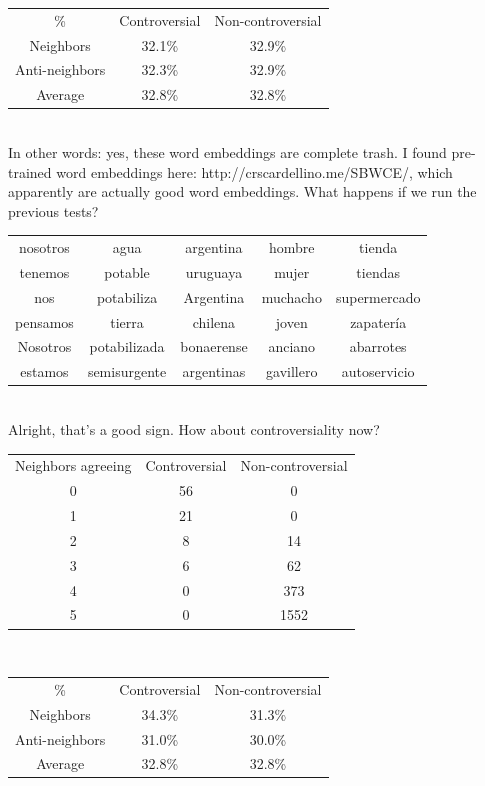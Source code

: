 \documentclass[11pt]{article} %
\begin{document}
\begin{tabular}{c|c|c}
\rowcolor{gray!50}\%   & Controversial & Non-controversial \\
Neighbors & 32.1\% &  32.9\%\\
Anti-neighbors & 32.3\% & 32.9\% \\
Average & 32.8\% &  32.8\% \end{tabular}\\

In other words: yes, these word embeddings are complete trash. I found pre-trained word embeddings here: http://crscardellino.me/SBWCE/, which apparently are actually good word embeddings. What happens if we run the previous tests?\\


\begin{tabular}{c|c|c|c|c}
\rowcolor{gray!50} nosotros & agua & argentina & hombre & tienda \\
tenemos & potable & uruguaya & mujer& tiendas \\
nos & potabiliza & Argentina & muchacho & supermercado \\
pensamos & tierra & chilena & joven & zapater\'ia\\
Nosotros & potabilizada & bonaerense & anciano & abarrotes\\
estamos & semisurgente & argentinas & gavillero & autoservicio \\
\end{tabular} \\

Alright, that's a good sign. How about controversiality now?\\

\begin{tabular}{c|c|c}
\rowcolor{gray!50} Neighbors agreeing & Controversial & Non-controversial \\
0 & 56 & 0 \\
1 & 21 & 0 \\
2 & 8 & 14 \\
3 & 6 & 62 \\
4 & 0 & 373 \\
5 & 0 &1552 \end{tabular}\\

\begin{tabular}{c|c|c}
\rowcolor{gray!50}\%   & Controversial & Non-controversial \\
Neighbors & 34.3\% &  31.3\%\\
Anti-neighbors & 31.0\% & 30.0\% \\
Average & 32.8\% &  32.8\% \end{tabular}\\
\end{document}
